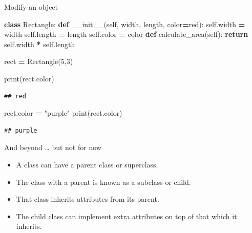 \documentclass[
  8pt,
  ignorenonframetext,
]{beamer}
\newenvironment{Shaded}{\begin{snugshade}}{\end{snugshade}}
\newcommand{\BuiltInTok}[1]{#1}
\newcommand{\ControlFlowTok}[1]{\textcolor[rgb]{0.13,0.29,0.53}{\textbf{#1}}}
\newcommand{\DecValTok}[1]{\textcolor[rgb]{0.00,0.00,0.81}{#1}}
\newcommand{\FunctionTok}[1]{\textcolor[rgb]{0.00,0.00,0.00}{#1}}
\newcommand{\KeywordTok}[1]{\textcolor[rgb]{0.13,0.29,0.53}{\textbf{#1}}}
\newcommand{\NormalTok}[1]{#1}
\newcommand{\OperatorTok}[1]{\textcolor[rgb]{0.81,0.36,0.00}{\textbf{#1}}}
\newcommand{\StringTok}[1]{\textcolor[rgb]{0.31,0.60,0.02}{#1}}
\newcommand{\VariableTok}[1]{\textcolor[rgb]{0.00,0.00,0.00}{#1}}
\begin{document}
\begin{frame}[fragile]{Modify an object}
\protect\hypertarget{modify-an-object}{}
\begin{Shaded}
\begin{Highlighting}[]
\KeywordTok{class}\NormalTok{ Rectangle:}
    \KeywordTok{def} \FunctionTok{\_\_init\_\_}\NormalTok{(}\VariableTok{self}\NormalTok{, width, length, color}\OperatorTok{=}\StringTok{\textquotesingle{}red\textquotesingle{}}\NormalTok{):}
        \VariableTok{self}\NormalTok{.width }\OperatorTok{=}\NormalTok{ width}
        \VariableTok{self}\NormalTok{.length }\OperatorTok{=}\NormalTok{ length}
        \VariableTok{self}\NormalTok{.color }\OperatorTok{=}\NormalTok{ color}
    \KeywordTok{def}\NormalTok{ calculate\_area(}\VariableTok{self}\NormalTok{):}
      \ControlFlowTok{return} \VariableTok{self}\NormalTok{.width }\OperatorTok{*} \VariableTok{self}\NormalTok{.length}

\NormalTok{rect }\OperatorTok{=}\NormalTok{ Rectangle(}\DecValTok{5}\NormalTok{,}\DecValTok{3}\NormalTok{)}

\BuiltInTok{print}\NormalTok{(rect.color)}
\end{Highlighting}
\end{Shaded}

\begin{verbatim}
## red
\end{verbatim}

\begin{Shaded}
\begin{Highlighting}[]
\NormalTok{rect.color }\OperatorTok{=} \StringTok{"purple"}  
\BuiltInTok{print}\NormalTok{(rect.color)}
\end{Highlighting}
\end{Shaded}

\begin{verbatim}
## purple
\end{verbatim}
\end{frame}

\begin{frame}{And beyond \ldots{} but not for now}
\protect\hypertarget{and-beyond-but-not-for-now}{}
\begin{itemize}
\item
  A class can have a parent class or superclass.
\item
  The class with a parent is known as a subclass or child.
\item
  That class inherits attributes from its parent.
\item
  The child class can implement extra attributes on top of that which it
  inherits.
\end{itemize}
\end{frame}
\end{document}
